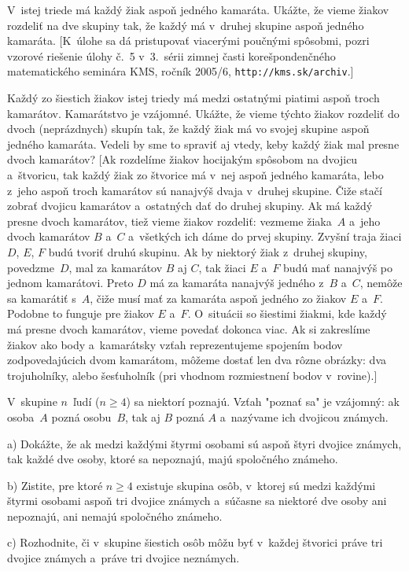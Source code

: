 {
V~istej triede má každý žiak aspoň jedného kamaráta. Ukážte, že vieme žiakov rozdeliť
na dve skupiny tak, že každý má v~druhej skupine aspoň jedného kamaráta.
[K~úlohe sa dá pristupovať viacerými poučnými spôsobmi, pozri
vzorové riešenie úlohy č.~5 v~3.~sérii zimnej časti korešpondenčného matematického seminára KMS, ročník 2005/6, {\tt http://kms.sk/archiv}.]

Každý zo šiestich žiakov istej triedy má medzi ostatnými piatimi aspoň troch kamarátov. Kamarátstvo je vzájomné.
Ukážte, že vieme týchto žiakov rozdeliť do dvoch (neprázdnych) skupín tak, že každý žiak má vo svojej skupine aspoň jedného kamaráta.
Vedeli by sme to spraviť aj vtedy, keby každý žiak mal presne dvoch kamarátov?
[Ak rozdelíme žiakov hocijakým spôsobom na dvojicu a~štvoricu, tak každý žiak zo štvorice má v~nej aspoň jedného kamaráta, lebo z~jeho aspoň troch kamarátov sú nanajvýš dvaja v~druhej skupine. Čiže stačí zobrať dvojicu kamarátov a~ostatných dať do druhej skupiny.
Ak má každý presne dvoch kamarátov, tiež vieme žiakov rozdeliť: vezmeme žiaka~$A$ a~jeho dvoch kamarátov $B$ a~$C$ a~všetkých ich dáme do prvej skupiny.
Zvyšní traja žiaci $D$, $E$, $F$ budú tvoriť druhú skupinu. Ak by niektorý žiak z~druhej skupiny, povedzme~$D$, mal za kamarátov $B$ aj $C$, tak žiaci $E$ a~$F$ budú mať nanajvýš po jednom kamarátovi. Preto $D$ má za kamaráta nanajvýš jedného z~$B$ a~$C$, nemôže sa kamarátiť s~$A$, čiže musí mať za kamaráta aspoň jedného zo žiakov $E$ a~$F$. Podobne to funguje pre žiakov $E$ a~$F$. O~situácii so šiestimi žiakmi, kde každý má presne dvoch kamarátov, vieme povedať dokonca viac. Ak si zakreslíme žiakov ako body a~kamarátsky vzťah reprezentujeme spojením bodov zodpovedajúcich dvom kamarátom, môžeme dostať len dva rôzne obrázky: dva trojuholníky, alebo šesťuholník (pri vhodnom rozmiestnení bodov v~rovine).]

\D
V~skupine $n$~ľudí ($n\ge 4$) sa niektorí poznajú. Vzťah "poznať sa" je vzájomný:
ak osoba~$A$ pozná osobu~$B$, tak aj $B$ pozná $A$ a~nazývame ich dvojicou známych.
\item{a)} Dokážte, že ak medzi každými štyrmi osobami sú aspoň štyri dvojice známych,
        tak každé dve osoby, ktoré sa nepoznajú, majú spoločného známeho.
\item{b)} Zistite, pre ktoré $n\ge 4$ existuje skupina osôb, v~ktorej sú medzi každými
   štyrmi osobami aspoň tri dvojice známych a~súčasne sa niektoré dve osoby
   ani nepoznajú, ani nemajú spoločného známeho.
\item{c)} Rozhodnite, či v~skupine šiestich osôb môžu byť v~každej štvorici práve tri
   dvojice známych a~práve tri dvojice neznámych.
\vpravo{[C-57-I-5]}

}

